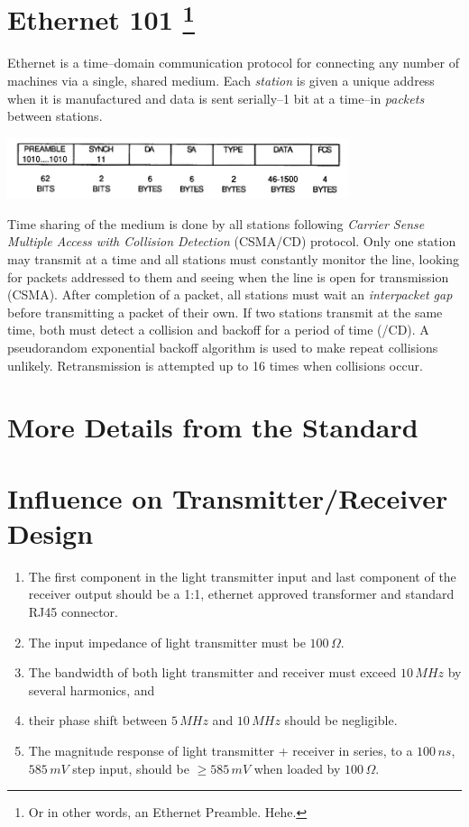 \documentclass{article}
\begin{document}
\section[title]{Ethernet 101 \footnote{Or in other words, an Ethernet Preamble. Hehe.}}

Ethernet is a time--domain communication protocol for connecting any number of
machines via a single, shared medium.
Each \textit{station} is given a unique address when it is manufactured and
data is sent serially--1 bit at a time--in \textit{packets} between
stations.

\begin{center}
	\includegraphics[width=0.75\textwidth]{ethernet-packet.pdf}
\end{center}

Time sharing of the medium is done by all stations following
\textit{Carrier Sense Multiple Access with Collision Detection}
(CSMA/CD) protocol.
Only one station may transmit at a time and all stations must constantly
monitor the line, looking for packets addressed to them and seeing when
the line is open for transmission (CSMA).
After completion of a packet, all stations must wait an
\textit{interpacket gap} before transmitting a packet of their own.
If two stations transmit at the same time, both must detect a collision
and backoff for a period of time (/CD).
A pseudorandom exponential backoff algorithm is used to make repeat
collisions unlikely.
Retransmission is attempted up to 16 times when collisions occur.

\section{More Details from the Standard}



\section{Influence on Transmitter/Receiver Design}

\begin{enumerate}
\item The first component in the light transmitter input
and last component of the receiver output should be a 1:1, ethernet approved
transformer and standard RJ45 connector.
\item The input impedance of light transmitter must be $100\,\Omega$.
\item The bandwidth of both light transmitter and receiver must exceed $10\,MHz$
by several harmonics, and
\item their phase shift between $5\,MHz$ and $10\,MHz$ should be negligible.
\item The magnitude response of light transmitter + receiver in series,
to a $100\,ns$, $585\,mV$ step input, should be $\geq585\,mV$ when loaded by $100\,\Omega$.
\end{enumerate}
\end{document}
